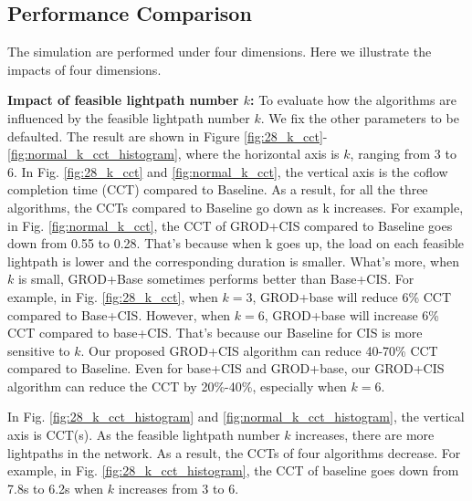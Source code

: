 \subsection{Performance Comparison}
The simulation are performed under four dimensions. Here we illustrate the impacts of four dimensions.

\textbf{Impact of feasible lightpath number $k$:}
To evaluate how the algorithms are influenced by the feasible lightpath number $k$. We fix the other parameters to be defaulted. The result are shown in Figure \ref{fig:28_k_cct}-\ref{fig:normal_k_cct_histogram}, where the horizontal axis is $k$, ranging from 3 to 6. In Fig. \ref{fig:28_k_cct} and \ref{fig:normal_k_cct}, the vertical axis is the coflow completion time (CCT) compared to Baseline. As a result, for all the three algorithms, the CCTs compared to Baseline go down as k increases. For example, in Fig. \ref{fig:normal_k_cct}, the CCT of GROD+CIS compared to Baseline goes down from 0.55 to 0.28. That's because when k goes up, the load on each feasible lightpath is lower and the corresponding duration is smaller. What's more, when $k$ is small, GROD+Base sometimes performs better than Base+CIS. For example, in Fig. \ref{fig:28_k_cct}, when $k=3$, GROD+base will reduce 6\% CCT compared to Base+CIS. However, when $k=6$, GROD+base will increase 6\% CCT compared to base+CIS. That's because our Baseline for CIS is more sensitive to $k$. Our proposed GROD+CIS algorithm can reduce 40-70\% CCT compared to Baseline. Even for base+CIS and GROD+base, our GROD+CIS algorithm can reduce the CCT by 20\%-40\%, especially when $k=6$.

In Fig. \ref{fig:28_k_cct_histogram} and \ref{fig:normal_k_cct_histogram}, the vertical axis is CCT(s). As the feasible lightpath number $k$ increases, there are more lightpaths in the network. As a result, the CCTs of four algorithms decrease. For example, in Fig. \ref{fig:28_k_cct_histogram}, the CCT of baseline goes down from 7.8s to 6.2s when $k$ increases from 3 to 6.

